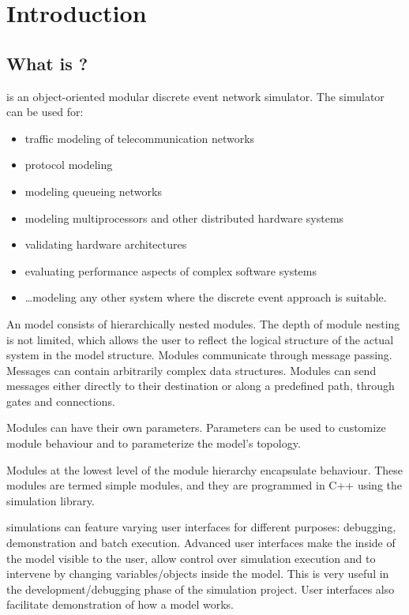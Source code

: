 \chapter{Introduction}
\label{cha:introduction}


\section{What is {\opp}?}

{\opp} is an object-oriented modular discrete event network simulator.
The simulator can be used for:

\begin{itemize}
  \item{traffic modeling of telecommunication networks}
  \item{protocol modeling}
  \item{modeling queueing networks}
  \item{modeling multiprocessors and other distributed hardware systems}
  \item{validating hardware architectures}
  \item{evaluating performance aspects of complex software systems}
  \item{\dots modeling any other system where the discrete event approach is
    suitable.}
\end{itemize}


An {\opp} model consists of hierarchically nested modules. The
depth of module nesting is not limited, which allows the user
to reflect the logical structure of the actual system in the
model structure. Modules communicate through message passing. Messages
can contain arbitrarily complex data structures. Modules can
send messages either directly to their destination or along a
predefined path, through gates and connections.


Modules can have their own parameters. Parameters can be used to customize
module behaviour and to parameterize the model's topology.

Modules at the lowest level of the module hierarchy encapsulate
behaviour. These modules are termed simple modules, and they are
programmed in C++ using the simulation library.

{\opp} simulations can feature varying user interfaces for
different purposes: debugging, demonstration and batch execution.
Advanced user interfaces make the inside of the model visible
to the user, allow control over simulation execution
and to intervene by changing variables/objects inside the model.
This is very useful in the development/debugging phase
of the simulation project. User interfaces also facilitate demonstration
of how a model works.

